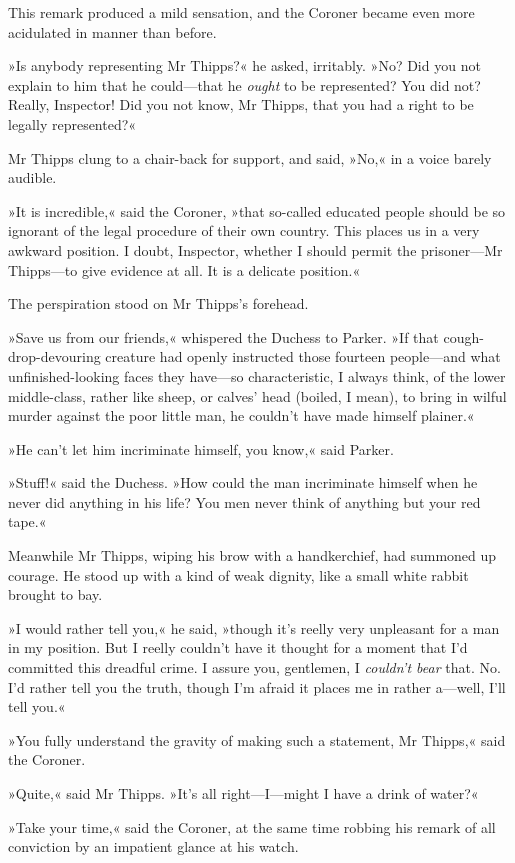 This remark produced a mild sensation, and the Coroner became even more acidulated in manner than before.

»Is anybody representing Mr Thipps?« he asked, irritably. »No? Did you not explain to him that he could—that he \textit{ought} to be represented? You did not? Really, Inspector! Did you not know, Mr Thipps, that you had a right to be legally represented?«

Mr Thipps clung to a chair-back for support, and said, »No,« in a voice barely audible.

»It is incredible,« said the Coroner, »that so-called educated people should be so ignorant of the legal procedure of their own country. This places us in a very awkward position. I doubt, Inspector, whether I should permit the prisoner—Mr Thipps—to give evidence at all. It is a delicate position.«

The perspiration stood on Mr Thipps's forehead.

»Save us from our friends,« whispered the Duchess to Parker. »If that cough-drop-devouring creature had openly instructed those fourteen people—and what unfinished-looking faces they have—so characteristic, I always think, of the lower middle-class, rather like sheep, or calves' head (boiled, I mean), to bring in wilful murder against the poor little man, he couldn't have made himself plainer.«

»He can't let him incriminate himself, you know,« said Parker.

»Stuff!« said the Duchess. »How could the man incriminate himself when he never did anything in his life? You men never think of anything but your red tape.«

Meanwhile Mr Thipps, wiping his brow with a handkerchief, had summoned up courage. He stood up with a kind of weak dignity, like a small white rabbit brought to bay.

»I would rather tell you,« he said, »though it's reelly very unpleasant for a man in my position. But I reelly couldn't have it thought for a moment that I'd committed this dreadful crime. I assure you, gentlemen, I \textit{couldn't bear} that. No. I'd rather tell you the truth, though I'm afraid it places me in rather a—well, I'll tell you.«

»You fully understand the gravity of making such a statement, Mr Thipps,« said the Coroner.

»Quite,« said Mr Thipps. »It's all right—I---might I have a drink of water?«

»Take your time,« said the Coroner, at the same time robbing his remark of all conviction by an impatient glance at his watch.

